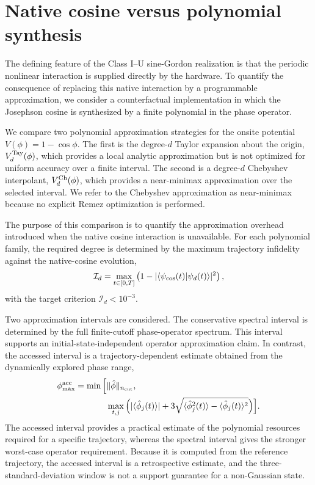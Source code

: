 \documentclass[pra,twocolumn,superscriptaddress,nofootinbib,floatfix]{revtex4-2}
\theoremstyle{remark}
\begin{document}
\section{Native cosine versus polynomial synthesis}
\label{app:sg-poly}
\label{subsec:sg-poly}

The defining feature of the Class I--U sine-Gordon realization is that the periodic nonlinear interaction is supplied directly by the hardware. To quantify the consequence of replacing this native interaction by a programmable approximation, we consider a counterfactual implementation in which the Josephson cosine is synthesized by a finite polynomial in the phase operator.

We compare two polynomial approximation strategies for the onsite potential
\(V(\phi)=1-\cos\phi .\)
The first is the degree-\(d\) Taylor expansion about the origin, \(V_d^{\rm Tay}(\phi)\), which provides a local analytic approximation but is not optimized for uniform accuracy over a finite interval. The second is a degree-\(d\) Chebyshev interpolant, \(V_d^{\rm Ch}(\phi)\), which provides a near-minimax approximation over the selected interval. We refer to the Chebyshev approximation as near-minimax because no explicit Remez optimization is performed.

The purpose of this comparison is to quantify the approximation overhead introduced when the native cosine interaction is unavailable. For each polynomial family, the required degree is determined by the maximum trajectory infidelity against the native-cosine evolution,
\[
\mathcal I_d=\max_{t\in[0,T]}\left(1-|\langle\psi_{\rm cos}(t)|\psi_d(t)\rangle|^2\right),
\]
with the target criterion \(\mathcal I_d<10^{-3}.\)

Two approximation intervals are considered. The conservative spectral interval is determined by the full finite-cutoff phase-operator spectrum. This interval supports an initial-state-independent operator approximation claim. In contrast, the accessed interval is a trajectory-dependent estimate obtained from the dynamically explored phase range,
\begin{align}
\phi_{\max}^{\rm acc}=\min\Big[&\|\hat\phi\|_{n_{\rm cut}},\nonumber\\
&\max_{t,j}\Big(|\langle\hat\phi_j(t)\rangle|+3\sqrt{\langle\hat\phi_j^2(t)\rangle-\langle\hat\phi_j(t)\rangle^2}\Big)\Big].
\end{align}
The accessed interval provides a practical estimate of the polynomial resources required for a specific trajectory, whereas the spectral interval gives the stronger worst-case operator requirement. Because it is computed from the reference trajectory, the accessed interval is a retrospective estimate, and the three-standard-deviation window is not a support guarantee for a non-Gaussian state.
\end{document}
